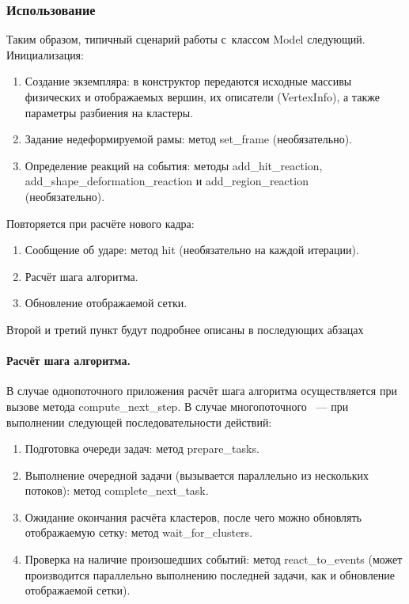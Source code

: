 \documentclass[a4paper, 14pt, titlepage]{extarticle}
\begin{document}
      \subsubsection{Использование}\label{sssec:usage}

        Таким образом, типичный сценарий работы с~классом Model следующий. Инициализация:
        \begin{enumerate}
          \item Создание экземпляра: в конструктор передаются исходные массивы физических и
          отображаемых вершин, их описатели (VertexInfo), а также параметры разбиения на кластеры.
          \item Задание недеформируемой рамы: метод set\_frame (необязательно).
          \item Определение реакций на события: методы add\_hit\_reaction,\\
          add\_shape\_deformation\_reaction и add\_region\_reaction\\
          (необязательно).
        \end{enumerate}
        Повторяется при расчёте нового кадра:
        \begin{enumerate}
          \item Сообщение об ударе: метод hit (необязательно на каждой итерации).
          \item Расчёт шага алгоритма.
          \item Обновление отображаемой сетки.
        \end{enumerate}
        Второй и третий пункт будут подробнее описаны в последующих абзацах

        \paragraph{Расчёт шага алгоритма.}
        В случае однопоточного приложения расчёт шага алгоритма осуществляется при вызове метода
        compute\_next\_step. В случае многопоточного ~--- при выполнении следующей
        последовательности действий:
        \begin{enumerate}
          \item Подготовка очереди задач: метод prepare\_tasks.
          \item Выполнение очередной задачи (вызывается параллельно из нескольких потоков): метод complete\_next\_task.
          \item Ожидание окончания расчёта кластеров, после чего можно
            обновлять отображаемую сетку: метод wait\_for\_clusters.
          \item Проверка на наличие произошедших событий: метод
            react\_to\_events (может производится параллельно выполнению последней задачи,
            как и обновление отображаемой сетки).
        \end{enumerate}
\end{document}
